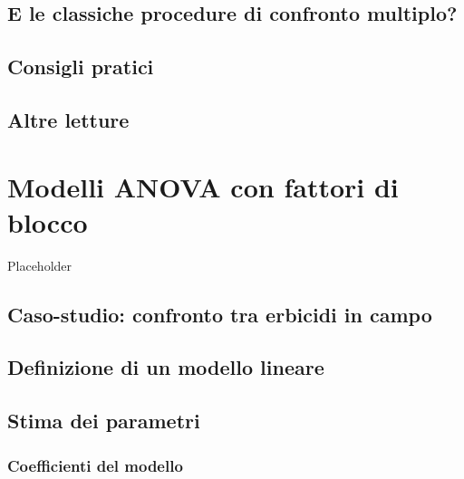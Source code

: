 \documentclass[a4paper,12pt,oneside]{book}
\begin{document}
\hypertarget{e-le-classiche-procedure-di-confronto-multiplo}{%
\section{E le classiche procedure di confronto multiplo?}\label{e-le-classiche-procedure-di-confronto-multiplo}}

\hypertarget{consigli-pratici}{%
\section{Consigli pratici}\label{consigli-pratici}}

\hypertarget{altre-letture-8}{%
\section{Altre letture}\label{altre-letture-8}}

\hypertarget{modelli-anova-con-fattori-di-blocco}{%
\chapter{Modelli ANOVA con fattori di blocco}\label{modelli-anova-con-fattori-di-blocco}}

Placeholder

\hypertarget{caso-studio-confronto-tra-erbicidi-in-campo}{%
\section{Caso-studio: confronto tra erbicidi in campo}\label{caso-studio-confronto-tra-erbicidi-in-campo}}

\hypertarget{definizione-di-un-modello-lineare-1}{%
\section{Definizione di un modello lineare}\label{definizione-di-un-modello-lineare-1}}

\hypertarget{stima-dei-parametri-1}{%
\section{Stima dei parametri}\label{stima-dei-parametri-1}}

\hypertarget{coefficienti-del-modello}{%
\subsection{Coefficienti del modello}\label{coefficienti-del-modello}}
\end{document}
